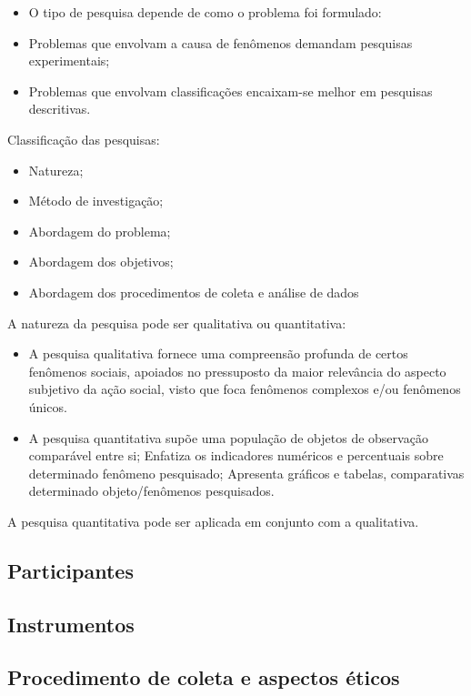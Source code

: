 \begin{itemize}
\item O tipo de pesquisa depende de como o problema foi formulado:
\item Problemas que envolvam a causa de fenômenos demandam pesquisas experimentais;
\item Problemas que envolvam classificações encaixam-se melhor em pesquisas descritivas.
\end{itemize}

Classificação das pesquisas:

\begin{itemize}
\item Natureza;
\item Método de investigação;
\item Abordagem do problema;
\item Abordagem dos objetivos;
\item Abordagem dos procedimentos de coleta e análise de dados
\end{itemize}

A natureza da pesquisa pode ser qualitativa ou quantitativa:

\begin{itemize}
\item A pesquisa qualitativa fornece uma compreensão profunda de certos fenômenos sociais, apoiados no
pressuposto da maior relevância do aspecto subjetivo da ação social, visto que foca fenômenos complexos e/ou fenômenos únicos.
\item A pesquisa quantitativa supõe uma população de objetos de observação comparável entre si; Enfatiza os indicadores numéricos e percentuais sobre determinado fenômeno pesquisado; Apresenta gráficos e tabelas, comparativas determinado objeto/fenômenos pesquisados.
\end{itemize}

A pesquisa quantitativa pode ser aplicada em conjunto com a qualitativa.



\subsection{Participantes}

\subsection{Instrumentos}

\subsection{Procedimento de coleta e aspectos éticos}

